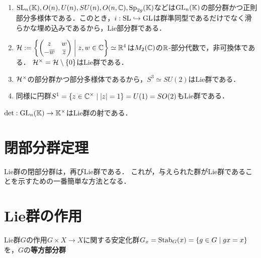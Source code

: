 \documentclass[uplatex,dvipdfmx]{jsreport}
\begin{document}
\begin{example}[Lie部分群]\mbox{}
    \begin{enumerate}
        \item $\mathrm{SL}_n(\mathbb{K}),O(n),U(n),SU(n),O(n,\mathbb{C}),\mathrm{Sp}_{2g}(\mathbb{K})$などは$\mathrm{GL}_n(\mathbb{K})$の部分群かつ正則部分多様体である．このとき，$i:\mathrm{SL}\hookrightarrow\mathrm{GL}$は群準同型であるだけでなく滑らかな埋め込みであるから，Lie部分群である．
        \item $\mathcal{H}:=\left\{\begin{pmatrix}z&w\\-\overline{w}&\overline{z}\end{pmatrix}\;\middle|\;z,w\in\mathbb{C}\right\}\simeq\mathbb{R}^4$は$M_2(\mathbb{C})$の$\mathbb{R}$-部分代数で，非可換体である．
        $\mathcal{H}^\times=\mathcal{H}\setminus\{0\}$はLie群である．
        \item $\mathcal{H}^\times$の部分群かつ部分多様体であるから，$S^3\simeq SU(2)$はLie群である．
        \item 同様に円群$S^1=\{z\in\mathbb{C}^\times\mid\lvert z\rvert=1\}=U(1)=SO(2)$もLie群である．
    \end{enumerate}
\end{example}

\begin{example}[Lie群の射]
    $\det:\mathrm{GL}_n(\mathbb{K})\to\mathbb{K}^\times$はLie群の射である．
\end{example}

\section{閉部分群定理}

\begin{tcolorbox}[colframe=ForestGreen, colback=ForestGreen!10!white,breakable,colbacktitle=ForestGreen!40!white,coltitle=black,fonttitle=\bfseries\sffamily,
title=]
    Lie群の閉部分群は，再びLie群である．
    これが，与えられた群がLie群であることを示すための一番簡単な方法となる．
\end{tcolorbox}

\section{Lie群の作用}

\begin{definition}
    Lie群$G$の作用$G\times X\to X$に関する安定化群$G_x=\mathrm{Stab}_G(x)=\{g\in G\mid gx=x\}$を，$G$の\textbf{等方部分群}
\end{definition}
\end{document}
